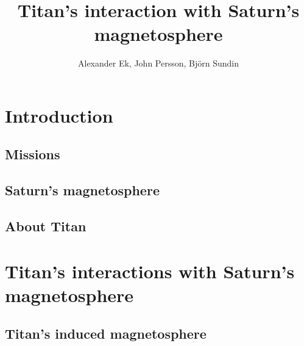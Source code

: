 \documentclass[12pt, titlepage, parskip=full*]{scrartcl}
\title{Titan's interaction with Saturn's magnetosphere}
\author{Alexander Ek, John Persson, Björn Sundin}
\begin{document}
\maketitle

\tableofcontents
\newpage

\section{Introduction}
\subsection{Missions}

\subsection{Saturn's magnetosphere}

\subsection{About Titan}


\section{Titan's interactions with Saturn's magnetosphere}

\subsection{Titan's induced magnetosphere}


\parencite{solar-system-magnetospheres}



\printbibliography
\end{document}
